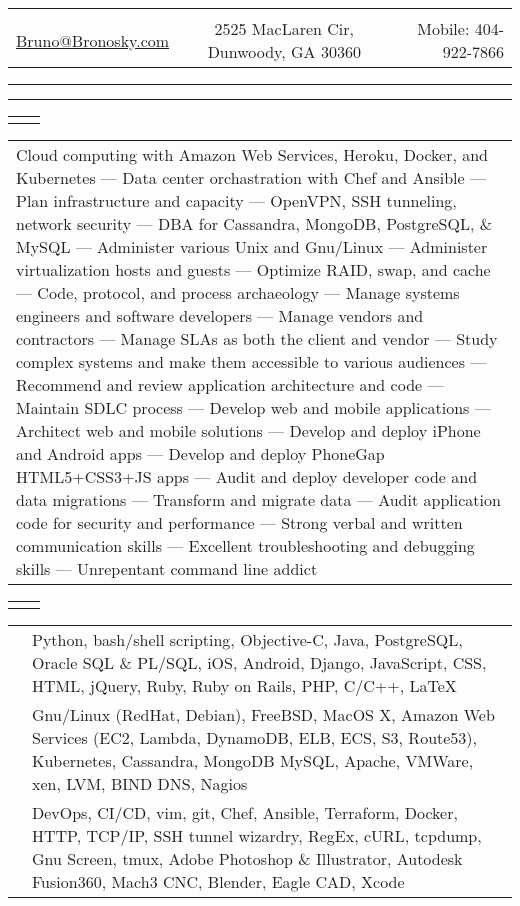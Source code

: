 \documentclass[letterpaper,10pt]{article}
\newcommand{\lineDouble}[0]{\hrule\vspace{2pt}\hrule\vspace{1.5pt}}
\newcommand{\sizeE}[0]{\fontsize{10pt}{12pt}\selectfont}
\newcommand{\sizeF}[0]{\fontsize{11pt}{13pt}\selectfont}
\newcommand{\heading}[4]{
    \begin{tabularx}{\textwidth}{LCR}
        &\huge{\textbf{\sc{#1}}}&\\
        \href{mailto:#2}{#2} & #3 & Mobile: #4\\
    \end{tabularx}
    \lineDouble
    \vspace{5pt}%
}
\newcounter{skipfirstcounter}
\newcommand{\blocktitle}[1]{
    \setcounter{skipfirstcounter}{0}
    \begin{tabularx}{\textwidth}{lR}
        {\sizeF\sc{#1}} & \noindent\hrulefill\\
    \end{tabularx}
}
\newcommand{\blockOverview}[1]{%
    \blocktitle{Overview}%
    \vspace{0.4mm}%
    \begin{tabular*}{\textwidth}{p{\textwidth}}%
        #1%
    \end{tabular*}%
    \vspace{2mm}%
}%
\newcommand{\blockSkills}[1]{
    \blocktitle{Skills}
    \begin{tabular*}{\textwidth}{p{22mm}p{171.6mm}}%
        #1%
    \end{tabular*}%
    \vspace{2.4mm}%
}
\newcommand{\skillgroup}[2]{{\sizeE{#1}} & #2\\\addlinespace[1.6mm]}
\newcommand{\skillgrouplast}[2]{{\sizeE{#1}} & #2\\}
\begin{document}
\heading{Bruno Bronosky}
{Bruno@Bronosky.com}
{2525 MacLaren Cir, Dunwoody, GA 30360}
{404-922-7866}

\blockOverview{
    Cloud computing with Amazon Web Services, Heroku, Docker, and Kubernetes ---
    Data center orchastration with Chef and Ansible ---
    Plan infrastructure and capacity ---
    OpenVPN, SSH tunneling, network security ---
    DBA for Cassandra, MongoDB, PostgreSQL, \& MySQL ---
    Administer various Unix and Gnu/Linux ---
    Administer virtualization hosts and guests ---
    Optimize RAID, swap, and cache ---
    Code, protocol, and process archaeology ---
    Manage systems engineers and software developers ---
    Manage vendors and contractors ---
    Manage SLAs as both the client and vendor ---
    Study complex systems and make them accessible to various audiences ---
    Recommend and review application architecture and code ---
    Maintain SDLC process ---
    Develop web and mobile applications ---
    Architect web and mobile solutions ---
    Develop and deploy iPhone and Android apps ---
    Develop and deploy PhoneGap HTML5+CSS3+JS apps ---
    Audit and deploy developer code and data migrations ---
    Transform and migrate data ---
    Audit application code for security and performance ---
    Strong verbal and written communication skills ---
    Excellent troubleshooting and debugging skills ---
    Unrepentant command line addict
}

\blockSkills{
    \skillgroup{Development}{
        Python,
        bash/shell scripting,
        Objective-C,
        Java,
        PostgreSQL,
        Oracle SQL \& PL/SQL,
        iOS,
        Android,
        Django,
        JavaScript,
        CSS,
        HTML,
        jQuery,
        Ruby,
        Ruby on Rails,
        PHP,
        C/C++,
        \LaTeX
    }

    \skillgroup{Operations}{
        Gnu/Linux (RedHat, Debian),
        FreeBSD,
        MacOS X,
        Amazon Web Services (EC2, Lambda, DynamoDB, ELB, ECS, S3, Route53),
        Kubernetes,
        Cassandra,
        MongoDB
        MySQL,
        Apache,
        VMWare,
        xen,
        LVM,
        BIND DNS,
        Nagios
    }

    \skillgrouplast{Concepts}{
        DevOps,
        CI/CD,
        vim,
        git,
        Chef,
        Ansible,
        Terraform,
        Docker,
        HTTP,
        TCP/IP,
        SSH tunnel wizardry,
        RegEx,
        cURL,
        tcpdump,
        Gnu Screen,
        tmux,
        Adobe Photoshop \& Illustrator,
        Autodesk Fusion360,
        Mach3 CNC,
        Blender,
        Eagle CAD,
        Xcode
    }
}
\end{document}
